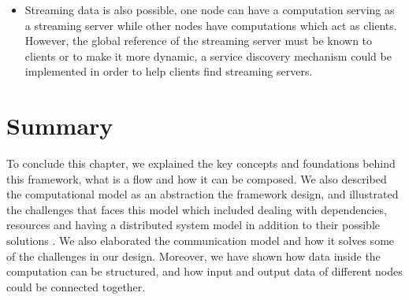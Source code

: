 \begin{itemize}
	\item Streaming data is also possible, one node can have a computation serving as a streaming server while other nodes have computations which act as clients. However, the global reference of the streaming server must be known to clients or to make it more dynamic, a service discovery mechanism could be implemented in order to help clients find streaming servers.
\end{itemize}	


\section{Summary}

To conclude this chapter, we explained the key concepts and foundations behind this framework, what is a flow and how it can be composed. We also described the computational model as an abstraction the framework design, and illustrated the challenges that faces this model which included  dealing with dependencies, resources and having a distributed system model in addition to their possible solutions . We also elaborated the communication model and how it solves some of the challenges in our design. Moreover, we have shown how data inside the computation can be structured, and how input and output data of different nodes could be connected together.


